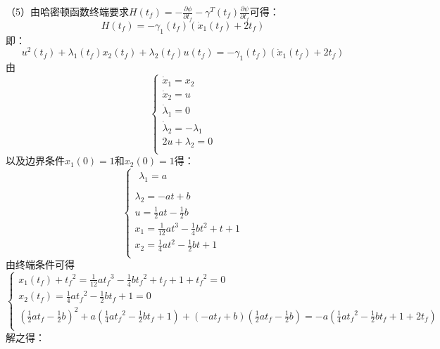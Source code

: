 \documentclass[UTF8]{ctexart}
\begin{document}
	（5）由哈密顿函数终端要求$H\left( {{t}_{f}} \right)=-\frac{\partial \phi }{\partial {{t}_{f}}}-{{\gamma }^{T}}\left( {{t}_{f}} \right)\frac{\partial \psi }{\partial {{t}_{f}}}$可得：
		\[H\left( {{t}_{f}} \right)=-{{\gamma }_{1}}\left( {{t}_{f}} \right)\left( {{{\dot{x}}}_{1}}\left( {{t}_{f}} \right)+2{{t}_{f}} \right)\]
		即：\[{{u}^{2}}\left( {{t}_{f}} \right)+{{\lambda }_{1}}\left( t{}_{f} \right)x{}_{2}\left( {{t}_{f}} \right)+{{\lambda }_{2}}\left( {{t}_{f}} \right)u\left( {{t}_{f}} \right)=-{{\gamma }_{1}}\left( {{t}_{f}} \right)\left( {{{\dot{x}}}_{1}}\left( {{t}_{f}} \right)+2{{t}_{f}} \right)\]
		由
		\[\left\{ \begin{array}{*{35}{l}}
   {{{\dot{x}}}_{1}}={{x}_{2}}  \\
   {{{\dot{x}}}_{2}}=u  \\
   {{{\dot{\lambda }}}_{1}}=0  \\
   {{{\dot{\lambda }}}_{2}}=-{{\lambda }_{1}}  \\
   2u+{{\lambda }_{2}}=0  \\
\end{array} \right.\]
以及边界条件${{x}_{1}}\left( 0 \right)=1$和${{x}_{2}}\left( 0 \right)=1$得：
\[\left\{ \begin{array}{*{35}{l}}
   \begin{array}{*{35}{l}}
   {{\lambda }_{1}}=a  \\
\end{array}  \\
   {{\lambda }_{2}}=-at+b  \\
   u=\frac{1}{2}at-\frac{1}{2}b  \\
   {{x}_{1}}=\frac{1}{12}a{{t}^{3}}-\frac{1}{4}b{{t}^{2}}+t+1  \\
   {{x}_{2}}=\frac{1}{4}a{{t}^{2}}-\frac{1}{2}bt+1  \\
\end{array} \right.\]
由终端条件可得
\[\left\{ \begin{array}{*{35}{l}}
   {{x}_{1}}\left( {{t}_{f}} \right)+{{t}_{f}}^{2}=\frac{1}{12}a{{t}_{f}}^{3}-\frac{1}{4}b{{t}_{f}}^{2}+{{t}_{f}}+1+{{t}_{f}}^{2}=0  \\
   {{x}_{2}}\left( {{t}_{f}} \right)=\frac{1}{4}a{{t}_{f}}^{2}-\frac{1}{2}b{{t}_{f}}+1=0  \\
   {{\left( \frac{1}{2}a{{t}_{f}}-\frac{1}{2}b \right)}^{2}}+a\left( \frac{1}{4}a{{t}_{f}}^{2}-\frac{1}{2}b{{t}_{f}}+1 \right)+\left( -a{{t}_{f}}+b \right)\left( \frac{1}{2}a{{t}_{f}}-\frac{1}{2}b \right)=-a\left( \frac{1}{4}a{{t}_{f}}^{2}-\frac{1}{2}b{{t}_{f}}+1+2{{t}_{f}} \right)  \\
\end{array} \right.\]解之得：
\end{document}
